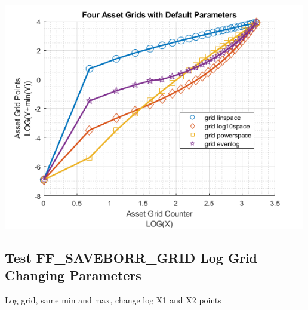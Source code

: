 \documentclass[
]{book}
\begin{document}
\includegraphics[width=5.20833in,height=\textheight]{img/fx_saveborr_grid_images/figure_1.png}

\hypertarget{test-ff_saveborr_grid-log-grid-changing-parameters}{%
\subsection{Test FF\_SAVEBORR\_GRID Log Grid Changing Parameters}\label{test-ff_saveborr_grid-log-grid-changing-parameters}}

Log grid, same min and max, change log X1 and X2 points
\end{document}
